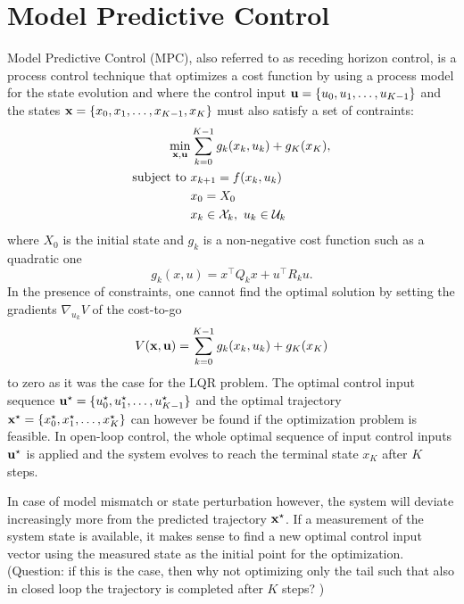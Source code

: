 \chapter{Model Predictive Control}
\label{sec:MPC}

Model Predictive Control (MPC), also referred to as receding horizon control, is a process control technique that optimizes a cost function by using a process model for the state evolution and where the control input $\boldsymbol{\mathrm{u}} = \{u_0,u_1,\ldots,u_{K-1}\}$ and the states $\boldsymbol{\mathrm{x}} = \{x_0,x_1,\ldots,x_{K-1},x_K\}$ must also satisfy a set of contraints:
\begin{equation}
  \label{eq:MPC-general-formulation}
  \begin{aligned}
    \min_{\boldsymbol{\mathrm{x}},\boldsymbol{\mathrm{u}}} &\sum_{k=0}^{K-1} g_k(x_k,u_k) + g_K(x_K),\\
    \text{subject to } & x_{k+1} = f(x_k,u_k) \\
                                                       & x_0 = X_0 \\
                                                       & x_k \in \mathcal{X}_k,\ u_k \in \mathcal{U}_k
  \end{aligned}
\end{equation}
where $X_0$ is the initial state and $g_k$ is a non-negative cost function such as a quadratic one
\begin{equation}
  \label{eq:quadratic-stage-cost}
  g_k(x,u) = x^\top Q_k x + u^\top R_k u.
\end{equation}
In the presence of constraints, one cannot find the optimal solution by setting the gradients $\nabla_{u_k} V$ of the cost-to-go
\begin{equation}
  \label{eq:cost-to-go}
  V(\boldsymbol{\mathrm{x}},\boldsymbol{\mathrm{u}}) = \sum_{k=0}^{K-1} g_k(x_k,u_k) + g_K(x_K)
\end{equation}
to zero as it was the case for the LQR problem. The optimal control input sequence $\boldsymbol{\mathrm{u}}^\star = \{u_0^\star,u_1^\star,\ldots,u_{K-1}^\star\}$ and the optimal trajectory $\boldsymbol{\mathrm{x}}^\star = \{x_0^\star,x_1^\star,\ldots,x_K^\star\}$ can however be found if the optimization problem is feasible. In open-loop control, the whole optimal sequence of input control inputs $\boldsymbol{\mathrm{u}}^\star$ is applied and the system evolves to reach the terminal state $x_K$ after $K$ steps.

In case of model mismatch or state perturbation however, the system will deviate increasingly more from the predicted trajectory $\boldsymbol{\mathrm{x}}^\star$. If a measurement of the system state is available, it makes sense to find a new optimal control input vector using the measured state as the initial point for the optimization. (Question: if this is the case, then why not optimizing only the tail such that also in closed loop the trajectory is completed after $K$ steps? )

